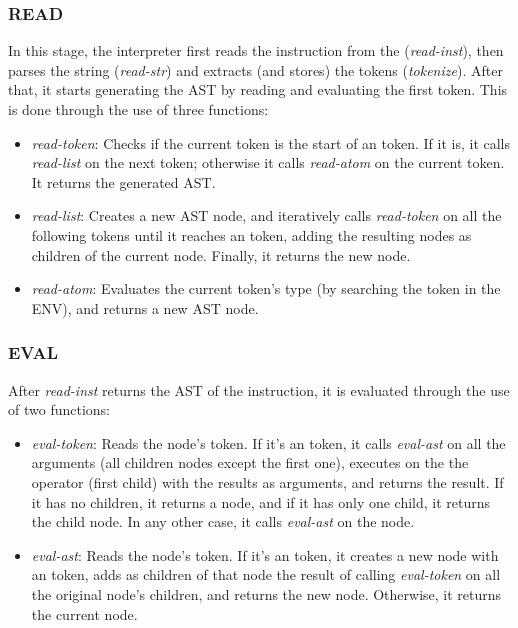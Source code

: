 \subsubsection{READ}\label{subsubsec:read}
In this stage, the \gls{interpreter} first reads the instruction from the  (\textit{read-inst}), then parses the string (\textit{read-str}) and extracts (and stores) the tokens (\textit{tokenize}). After that, it starts generating the \gls{AST} by reading and evaluating the first token. This is done through the use of three functions:
\begin{itemize}
  \item \textit{read-token}: Checks if the current token is the start of an  token. If it is, it calls \textit{read-list} on the next token; otherwise it calls \textit{read-atom} on the current token. It returns the generated \gls{AST}.
  \item \textit{read-list}: Creates a new \gls{AST} node, and iteratively calls \textit{read-token} on all the following tokens until it reaches an  token, adding the resulting nodes as children of the current node. Finally, it returns the new node.
  \item \textit{read-atom}: Evaluates the current token's type (by searching the token in the ENV), and returns a new \gls{AST} node.
\end{itemize}

\subsubsection{EVAL}\label{subsubsec:eval}
After \textit{read-inst} returns the \gls{AST} of the instruction, it is evaluated through the use of two functions:
\begin{itemize}
  \item \textit{eval-token}: Reads the node's token. If it's an  token, it calls \textit{eval-ast} on all the arguments (all children nodes except the first one), executes on the  the operator (first child) with the results as arguments, and returns the result. If it has no children, it returns a  node, and if it has only one child, it returns the child node. In any other case, it calls \textit{eval-ast} on the node.
  \item \textit{eval-ast}: Reads the node's token. If it's an  token, it creates a new node with an  token, adds as children of that node the result of calling \textit{eval-token} on all the original node's children, and returns the new node. Otherwise, it returns the current node.
\end{itemize}

